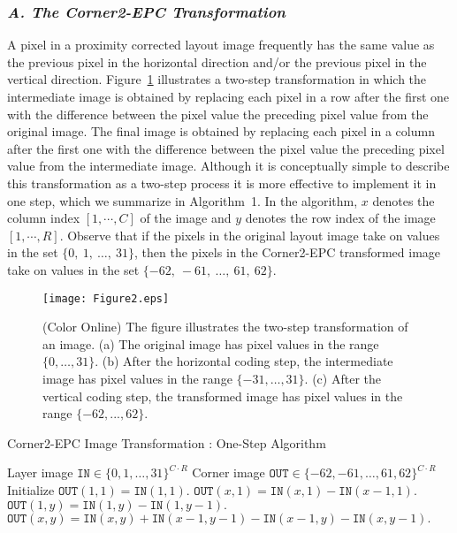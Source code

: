 \documentclass{article}
\begin{document}
\subsubsection*{{\em A. The Corner2-EPC Transformation}}
A pixel in a proximity corrected layout image frequently has the same value
as the previous pixel in the horizontal direction and/or the previous
pixel in the vertical direction.  Figure~\ref{fig:trans} illustrates a 
two-step 
transformation in which the intermediate image is obtained by replacing
each pixel in a row after the first one with the difference between the
pixel value the preceding pixel value from the original image.
The final image is obtained by replacing each pixel in a column after the 
first one with the difference between the pixel value the preceding pixel 
value from the intermediate image.
Although it is conceptually simple to describe this transformation as a
two-step process it is more effective to implement it in one step, which
we summarize in Algorithm~1.  In the algorithm, $x$ denotes the column index 
$[1, \cdots, C]$ of the image and $y$ denotes the row index 
of the image $[1, \cdots, R]$.  Observe that if the pixels in the original
layout image take on values in the set $\{0, \ 1, \ \dots , \ 31\}$, then
the pixels in the Corner2-EPC transformed image take on values in the set 
$\{-62, \ -61, \ \dots , \ 61 , \ 62 \}$.  

\begin{figure}
\centering
\texttt{[image: Figure2.eps]}
\caption{(Color Online) The figure illustrates the two-step transformation 
of an image. (a) The original image has pixel values in 
the range $\{0, \dots , 31\}$. (b) After the horizontal coding step, the 
intermediate image has pixel values in the range $\{-31, \dots , 31\}$. 
(c) After the vertical coding step, the transformed image has pixel values 
in the range $\{-62, ..., 62\}$.}
\label{fig:trans}
\end{figure}

\begin{algorithm}[!htb]
\caption{Corner2-EPC Image Transformation : One-Step Algorithm}
\label{alg:transform1}
\begin{algorithmic}[1]
\renewcommand{\algorithmicrequire} {\textbf{Input:}}
\REQUIRE Layer image $\texttt{IN} \in \{0, 1, \dots , 31\}^{C \cdot R}$
\renewcommand{\algorithmicrequire} {\textbf{Output:}}
\REQUIRE Corner image $\texttt{OUT} \in \{-62, -61, \dots , 61, 62 \}^{C \cdot R}$
\STATE Initialize $\texttt{OUT}(1,1)= \texttt{IN}(1,1).$
        \STATE $\texttt{OUT}(x,1)= \texttt{IN}(x,1) - \texttt{IN}(x-1,1).$
\ENDFOR
{}
        \STATE $\texttt{OUT}(1,y)= \texttt{IN}(1,y) - \texttt{IN}(1,y-1).$
        \STATE $\texttt{OUT}(x,y)= \texttt{IN}(x,y) + \texttt{IN}(x-1,y-1) - \texttt{IN}(x-1,y) - \texttt{IN}(x,y-1).$
        \ENDFOR
\ENDFOR
\end{algorithmic}
\end{algorithm}
\end{document}
